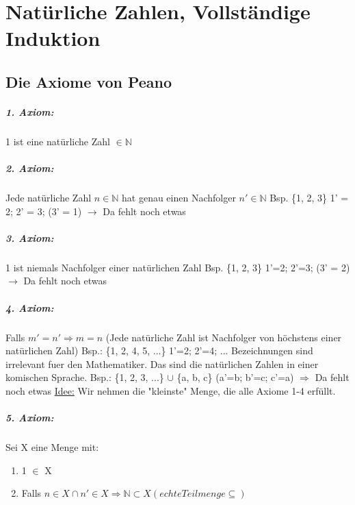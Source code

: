 \chapter{Natürliche Zahlen, Vollständige Induktion}

\section{Die Axiome von Peano}
\paragraph{1. Axiom:}
1 ist eine natürliche Zahl $\in \mathbb{N}$

\paragraph{2. Axiom:}
Jede natürliche Zahl $n \in \mathbb{N}$ hat genau einen Nachfolger $n' \in \mathbb{N}$\newline
Bsp. \{1, 2, 3\} 1' = 2; 2' = 3; (3' = 1) $\rightarrow$ Da fehlt noch etwas

\paragraph{3. Axiom:}
1 ist niemals Nachfolger einer natürlichen Zahl\newline
Bsp. \{1, 2, 3\} 1'=2; 2'=3; (3' = 2) $\rightarrow$ Da fehlt noch etwas

\paragraph{4. Axiom:}
Falls $m'=n' \Rightarrow m=n$ (Jede natürliche Zahl ist Nachfolger von höchstens einer natürlichen Zahl)\newline
Bsp.: \{1, 2, 4, 5, ...\}  1'=2; 2'=4; ... Bezeichnungen sind irrelevant fuer den Mathematiker. Das sind die natürlichen Zahlen in einer komischen Sprache.\newline
Bsp.: \{1, 2, 3, ...\} $\cup$ \{a, b, c\} (a'=b; b'=c; c'=a) $\Rightarrow$ Da fehlt noch etwas\newline
\underline{Idee:} Wir nehmen die "kleinste" Menge, die alle Axiome 1-4 erfüllt.

\paragraph{5. Axiom:}
Sei X eine Menge mit:
\begin{enumerate}
\item 1 $\in$ X
\item Falls $n \in X \cap  n' \in X \Rightarrow \mathbb{N} \subset X (echte Teilmenge \subseteq )$
\end{enumerate}

